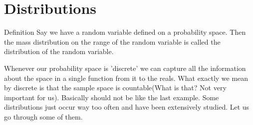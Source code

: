 \documentclass{myclass}
\begin{document}
\section{Distributions}
\begin{greenthm}{Definition}
    Say we have a random variable defined on a probability space. Then the mass distribution on the range of the random variable is called the distribution of the random variable.
\end{greenthm}

Whenever our probability space is 'discrete' we can capture all the information about the space in a single function from it to the reals. What exactly we mean by discrete is that the sample space is countable(What is that? Not very important for us). Basically should not be like the last example.
Some distributions just occur way too often and have been extensively studied. Let us go through some of them.
\end{document}
